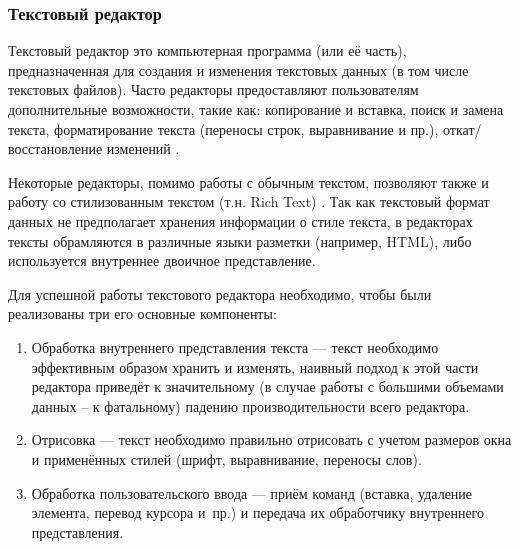 \documentclass{fefu}
\begin{document}
			\subsubsection{Текстовый редактор}
				\par Текстовый редактор это компьютерная программа (или её часть), 
				предназначенная для создания и изменения текстовых данных (в том числе 
				текстовых файлов). Часто редакторы предоставляют пользователям дополнительные 
				возможности, такие как: копирование и вставка, поиск и замена текста, 
				форматирование текста (переносы строк, выравнивание и пр.), 
				откат/восстановление изменений \cite{WhatIsATextEditor}. 
				\par Некоторые редакторы, помимо работы с обычным текстом, позволяют также и
				работу со стилизованным текстом (т.н. Rich Text) 
				\cite{DiffBetweenTextFormats}. Так как текстовый формат данных не предполагает
				хранения информации о стиле текста, в редакторах тексты обрамляются в различные
				языки разметки (например, HTML), либо используется внутреннее двоичное 
				представление.
				\par Для успешной работы текстового редактора необходимо, чтобы были
				реализованы три его основные компоненты: \cite{CraftOfTextEditing}
				\begin{enumerate}
					\item Обработка внутреннего представления текста --- текст необходимо
					эффективным образом хранить и изменять, наивный подход к этой части
					редактора приведёт к значительному (в случае работы с большими объемами
					данных -- к фатальному) падению производительности всего редактора.
					\item Отрисовка --- текст необходимо правильно отрисовать с учетом размеров
					окна и применённых стилей (шрифт, выравнивание, переносы слов).
					\item Обработка пользовательского ввода --- приём команд
					(вставка, удаление элемента, перевод курсора и~пр.) и передача их
					обработчику внутреннего представления.
				\end{enumerate}
\end{document}
